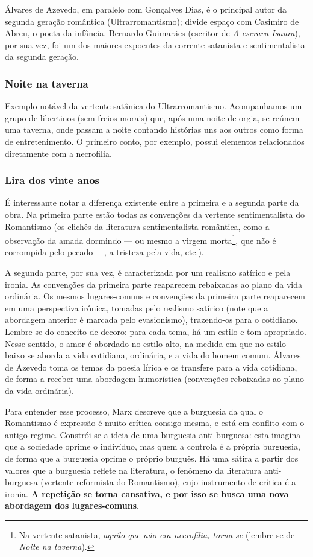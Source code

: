 Álvares de Azevedo, em paralelo com Gonçalves Dias, é o principal autor da segunda geração romântica (Ultrarromantismo); divide espaço com Casimiro de Abreu, o poeta da infância. Bernardo Guimarães (escritor de \textit{A escrava Isaura}), por sua vez, foi um dos maiores expoentes da corrente satanista e sentimentalista da segunda geração.

\subsubsection{Noite na taverna}

Exemplo notável da vertente satânica do Ultrarromantismo. Acompanhamos um grupo de libertinos (sem freios morais) que, após uma noite de orgia, se reúnem uma taverna, onde passam a noite contando histórias uns aos outros como forma de entretenimento. O primeiro conto, por exemplo, possui elementos relacionados diretamente com a necrofilia.

\subsubsection{Lira dos vinte anos}

É interessante notar a diferença existente entre a primeira e a segunda parte da obra. Na primeira parte estão todas as convenções da vertente sentimentalista do Romantismo (os clichês da literatura sentimentalista romântica, como a observação da amada dormindo — ou mesmo a virgem morta\footnote{Na vertente satanista, \textit{aquilo que não era necrofilia, torna-se} (lembre-se de \textit{Noite na taverna}).}, que não é corrompida pelo pecado —, a tristeza pela vida, etc.).

A segunda parte, por sua vez, é caracterizada por um realismo satírico e pela ironia. As convenções da primeira parte reaparecem rebaixadas ao plano da vida ordinária. Os mesmos lugares-comuns e convenções da primeira parte reaparecem em uma perspectiva irônica, tomadas pelo realismo satírico (note que a abordagem anterior é marcada pelo evasionismo), trazendo-os para o cotidiano. Lembre-se do conceito de decoro: para cada tema, há um estilo e tom apropriado. Nesse sentido, o amor é abordado no estilo alto, na medida em que no estilo baixo se aborda a vida cotidiana, ordinária, e a vida do homem comum. Álvares de Azevedo toma os temas da poesia lírica e os transfere para a vida cotidiana, de forma a receber uma abordagem humorística (convenções rebaixadas ao plano da vida ordinária).

Para entender esse processo, Marx descreve que a burguesia da qual o Romantismo é expressão é muito crítica consigo mesma, e está em conflito com o antigo regime. Constrói-se a ideia de uma burguesia anti-burguesa: esta imagina que a sociedade oprime o indivíduo, mas quem a controla é a própria burguesia, de forma que a burguesia oprime o próprio burguês. Há uma sátira a partir dos valores que a burguesia reflete na literatura, o fenômeno da literatura anti-burguesa (vertente reformista do Romantismo), cujo instrumento de crítica é a ironia. \textbf{A repetição se torna cansativa, e por isso se busca uma nova abordagem dos lugares-comuns}.

